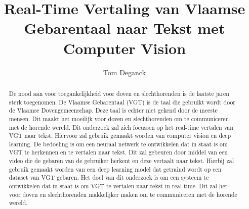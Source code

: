 \documentclass{hogent-article}
\title{Real-Time Vertaling van Vlaamse Gebarentaal naar Tekst met Computer Vision}
\author{Tom Deganck}
\begin{document}
\begin{abstract}
De nood aan voor toegankelijkheid voor doven en slechthorenden is de laatste jaren sterk toegenomen. 
De Vlaamse Gebarentaal (VGT) is de taal die gebruikt wordt door de Vlaamse Dovengemeenschap. 
Deze taal is echter niet gekend door de meeste mensen. 
Dit maakt het moeilijk voor doven en slechthorenden om te communiceren met de horende wereld. 
Dit onderzoek zal zich focussen op het real-time vertalen van VGT naar tekst. 
Hiervoor zal gebruik gemaakt worden van computer vision en deep learning.
De bedoeling is om een neuraal netwerk te ontwikkelen dat in staat is om VGT te herkennen en te vertalen naar tekst. 
Dit zal gebeuren door middel van een video die de gebaren van de gebruiker herkent en deze vertaalt naar tekst. 
Hierbij zal gebruik gemaakt worden van een deep learning model dat getraind wordt op een dataset van VGT gebaren.
Het doel van dit onderzoek is om een systeem te ontwikkelen dat in staat is om VGT te vertalen naar tekst in real-time. 
Dit zal het voor doven en slechthorenden makkelijker maken om te communiceren met de horende wereld.
\end{abstract}

\tableofcontents



\printbibliography[heading=bibintoc]
\end{document}
